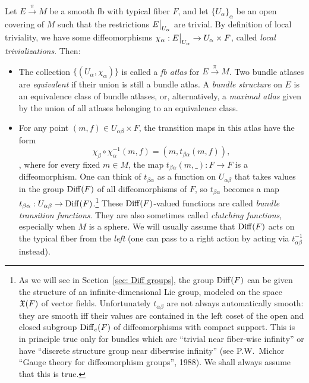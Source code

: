 \begin{defn}
    Let $E\overset{\pi}{\to}M$ be a smooth \gls{fb} with typical fiber $F$, and let $\{U_\alpha\}_\alpha$ be an open covering of $M$ such that the restrictions $\restr{E}{U_\alpha}$ are trivial. By definition of local triviality, we have some diffeomorphisms $\chi_\alpha: \restr{E}{U_\alpha}\to U_\alpha\times F$, called \emph{local trivializations}. Then:
\begin{itemize}

    \item The collection $\{(U_\alpha,\chi_\alpha)\}$ is called a \emph{\gls{fb} atlas} for $E\overset{\pi}{\to}M$. Two bundle atlases are \emph{equivalent} if their union is still a bundle atlas. A \emph{bundle structure} on $E$ is an equivalence class of bundle atlases, or, alternatively, a \emph{maximal atlas} given by the union of all atlases belonging to an equivalence class.
    
    \item For any point $(m,f)\in U_{\alpha\beta}\times F$, the transition maps in this atlas have the form \[\chi_\beta\circ\chi_\alpha^{-1} (m,f)=(m, t_{\beta\alpha}(m,f)),\label{eq transition functions}\], 
    where for every fixed $m\in M$, the map $t_{\beta\alpha}(m,\_):F\to F$ is a diffeomorphism. One can think of $t_{\beta\alpha}$ as a function on $U_{\alpha\beta}$ that takes values in the group $\operatorname{Diff}(F)$ of all diffeomorphisms of $F$, so $t_{\beta\alpha}$ becomes a map $t_{\beta\alpha}:U_{\alpha\beta}\to \operatorname{Diff}(F)$.\footnote{As we will see in Section~\ref{sec: Diff groups}, the group $\operatorname{Diff}(F)$ can be given the structure of an infinite-dimensional Lie group, modeled on the space $\mathfrak{X}(F)$ of vector fields. Unfortunately $t_{\alpha\beta}$ are not always automatically smooth: they are smooth iff their values are contained in the left coset of the open and closed subgroup $\operatorname{Diff}_c(F)$ of diffeomorphisms with compact support. This is in principle true only for bundles which are ``trivial near fiber-wise infinity'' or have ``discrete structure group near diberwise infinity'' (see P.W.~Michor ``Gauge theory for diffeomorphism groups'', 1988). We shall always assume that this is true.}
    These $\operatorname{Diff}(F)$-valued functions are called \emph{bundle transition functions}. They are also sometimes called \emph{clutching functions}, especially when $M$ is a sphere. We will usually assume that $\operatorname{Diff}(F)$ acts on the typical fiber from the \emph{left} (one can pass to a right action by acting via $t_{\alpha\beta}^{-1}$ instead).
    

\end{itemize}
\end{defn}
